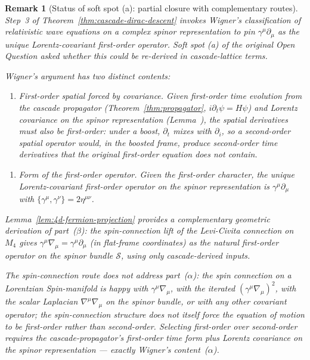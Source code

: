 \documentclass[12pt,a4paper]{article}
\newtheorem*{remark}{Remark}
\begin{document}
\begin{remark}[Status of soft spot (a): partial closure with complementary routes]\label{rem:a-closed}
Step~3 of Theorem~\ref{thm:cascade-dirac-descent} invokes Wigner's
classification of relativistic wave equations on a complex spinor
representation to pin $\gamma^\mu\partial_\mu$ as the unique
Lorentz-covariant first-order operator. Soft spot (a) of the
original Open Question asked whether this could be re-derived in
cascade-lattice terms.

Wigner's argument has two distinct contents:
\begin{enumerate}[label=($\alpha$),nosep]
\item \emph{First-order spatial forced by covariance.} Given
first-order time evolution from the cascade propagator
(Theorem~\ref{thm:propagator}, $i\partial_t\psi = H\psi$) and
Lorentz covariance on the spinor representation
(Lemma~), the spatial derivatives
must also be first-order: under a boost, $\partial_t$ mixes with
$\partial_i$, so a second-order spatial operator would, in the
boosted frame, produce second-order time derivatives that the
original first-order equation does not contain.
\end{enumerate}
\begin{enumerate}[label=($\beta$),nosep]
\item \emph{Form of the first-order operator.} Given the
first-order character, the unique Lorentz-covariant first-order
operator on the spinor representation is $\gamma^\mu\partial_\mu$
with $\{\gamma^\mu, \gamma^\nu\} = 2\eta^{\mu\nu}$.
\end{enumerate}

Lemma~\ref{lem:4d-fermion-projection} provides a complementary
\emph{geometric} derivation of part~($\beta$): the spin-connection
lift of the Levi-Civita connection on $M_4$ gives
$\gamma^\mu\nabla_\mu = \gamma^\mu\partial_\mu$ (in flat-frame
coordinates) as the natural first-order operator on the spinor
bundle $\mathcal{S}$, using only cascade-derived inputs.

The spin-connection route does \emph{not} address
part~($\alpha$): the spin connection on a Lorentzian
Spin-manifold is happy with $\gamma^\mu\nabla_\mu$, with the
iterated $(\gamma^\mu\nabla_\mu)^2$, with the scalar Laplacian
$\nabla^\mu\nabla_\mu$ on the spinor bundle, or with any other
covariant operator; the spin-connection structure does not
itself force the equation of motion to be first-order rather
than second-order. Selecting first-order over second-order
requires the cascade-propagator's first-order time form plus
Lorentz covariance on the spinor representation --- exactly
Wigner's content~($\alpha$).


\end{remark}
\end{document}
